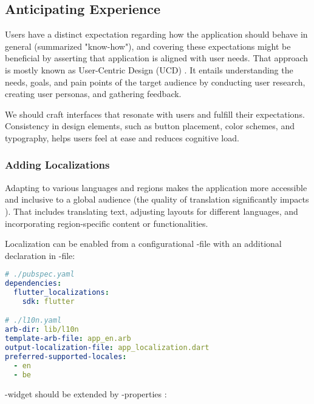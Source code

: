 
\subsection{Anticipating Experience}

Users have a distinct expectation regarding how the application should behave in general (summarized "know-how"), and 
covering these expectations might be beneficial by asserting that application is aligned with user needs. That approach
is mostly known as User-Centric Design (UCD) \cite{Stil16}. It entails understanding the needs, goals, and pain points 
of the target audience by conducting user research, creating user personas, and gathering feedback. 

We should craft interfaces that resonate with users and fulfill their expectations. Consistency in design elements, 
such as button placement, color schemes, and typography, helps users feel at ease and reduces cognitive load.


\subsubsection{Adding Localizations} \label{locale}

Adapting to various languages and regions makes the application more accessible and inclusive to a global audience (the 
quality of translation significantly impacts \cite{Lomm07}). That includes translating text, adjusting layouts for 
different languages, and incorporating region-specific content or functionalities.

\noindent Localization can be enabled from a configurational -file with an additional declaration in 
-file: 

\begin{lstlisting}[language=yaml]
# ./pubspec.yaml
dependencies:
  flutter_localizations:
    sdk: flutter

# ./l10n.yaml
arb-dir: lib/l10n
template-arb-file: app_en.arb
output-localization-file: app_localization.dart
preferred-supported-locales:
  - en
  - be
\end{lstlisting}

\noindent {}-widget should be extended by -properties :

